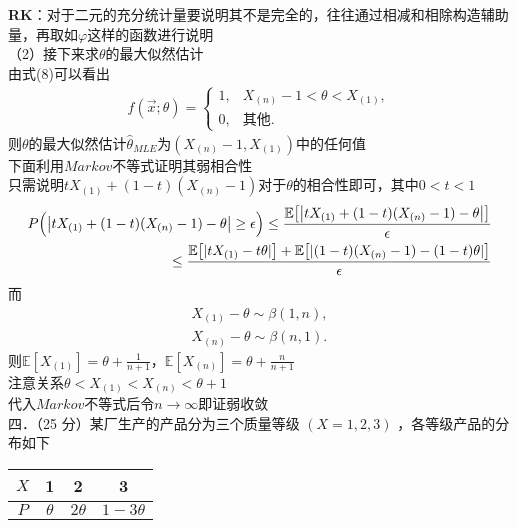 \documentclass[12pt]{article}
\begin{document}
\textbf{RK}：对于二元的充分统计量要说明其不是完全的，往往通过相减和相除构造辅助量，再取如$\varphi$这样的函数进行说明\\
（2）接下来求$\theta$的最大似然估计\\
由式(8)可以看出\\
\begin{gather}
f(\vec{x};\theta) = \begin{cases}
1, & X_{(n)}-1<\theta<X_{(1)}, \\
0, & \text{其他}.
\end{cases}
\end{gather}
则$\theta$的最大似然估计$\hat{\theta}_{MLE}$为$(X_{(n)}-1, X_{(1)})$中的任何值\\
下面利用$Markov$不等式证明其弱相合性\\
只需说明$tX_{(1)}+(1-t)(X_{(n)}-1)$对于$\theta$的相合性即可，其中$0<t<1$\\
$$
	\begin{aligned}
		P\Bigl(\bigl|tX_{(1)}+(1-t)(X_{(n)}-1)-\theta\bigr| \geq \epsilon\Bigr) \leq \frac{\mathbb{E}\bigl[\bigl|tX_{(1)}+(1-t)(X_{(n)}-1)-\theta\bigr|\bigr]}{\epsilon}& \\
		\leq \frac{\mathbb{E}\bigl[|tX_{(1)}-t\theta|\bigr] + \mathbb{E}\bigl[|(1-t)(X_{(n)}-1)-(1-t)\theta|\bigr]}{\epsilon}&
	\end{aligned}
$$
而
\begin{gather}
X_{(1)}-\theta \sim \beta(1,n), \\
X_{(n)}-\theta \sim \beta(n,1).
\end{gather}
则$\mathbb{E}[X_{(1)}] = \theta + \frac{1}{n+1}$，$\mathbb{E}[X_{(n)}] = \theta + \frac{n}{n+1}$\\
注意关系$\theta < X_{(1)} < X_{(n)} < \theta + 1$\\
代入$Markov$不等式后令$n\rightarrow \infty$即证弱收敛\\


\noindent 四．（25 分）某厂生产的产品分为三个质量等级 $(X=1,2,3)$ ，各等级产品的分布如下\\
\begin{center}
\begin{tabular}{c|ccc}
\hline
$X$ & 1 & 2 & 3 \\
\hline
$P$ & $\theta$ & $2 \theta$ & $1-3 \theta$ \\
\hline
\end{tabular}
\end{center}
\end{document}

